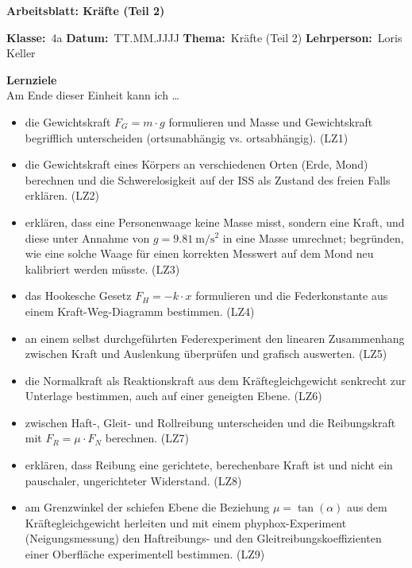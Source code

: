 \documentclass[addpoints,11pt,a4paper]{exam}
\newcommand{\Kopfzeile}[4]{%
  \begin{titlebox}
    {\color{white}\sffamily\bfseries\Large #4}
  \end{titlebox}
  \vspace{0.5em}
  \noindent\textbf{Klasse:}~#1 \hfill \textbf{Datum:}~#2 \hfill \textbf{Thema:}~#3
    \hfill \textbf{Lehrperson:}~Loris Keller
  \vspace{0.8em}
  \lhead{\textcolor{darkgray}{#3}}
  \rhead{\textcolor{darkgray}{#4}}
}
\newcommand{\Klasse}{4a}
\newcommand{\Datum}{TT.MM.JJJJ}
\newcommand{\Thema}{Kräfte (Teil 2)}
\newcommand{\ArbeitsblattTitel}{Arbeitsblatt: Kräfte (Teil 2)}
\begin{document}
\Kopfzeile{\Klasse}{\Datum}{\Thema}{\ArbeitsblattTitel}

\begin{infobox}
\textbf{Lernziele}\\
Am Ende dieser Einheit kann ich \dots
\begin{itemize}[leftmargin=1.2cm,itemsep=0.25em]
  \item die Gewichtskraft $F_G = m\cdot g$ formulieren und Masse und
  Gewichtskraft begrifflich unterscheiden (ortsunabhängig vs.
  ortsabhängig). (LZ1)
  \item die Gewichtskraft eines Körpers an verschiedenen Orten (Erde, Mond)
  berechnen und die Schwerelosigkeit auf der ISS als Zustand des freien
  Falls erklären. (LZ2)
  \item erklären, dass eine Personenwaage keine Masse misst, sondern eine
  Kraft, und diese unter Annahme von $g=\SI{9.81}{\meter\per\second\squared}$
  in eine Masse umrechnet; begründen, wie eine solche Waage für einen
  korrekten Messwert auf dem Mond neu kalibriert werden müsste. (LZ3)
  \item das Hookesche Gesetz $F_H = -k\cdot x$ formulieren und die
  Federkonstante aus einem Kraft-Weg-Diagramm bestimmen. (LZ4)
  \item an einem selbst durchgeführten Federexperiment den linearen
  Zusammenhang zwischen Kraft und Auslenkung überprüfen und grafisch
  auswerten. (LZ5)
  \item die Normalkraft als Reaktionskraft aus dem Kräftegleichgewicht
  senkrecht zur Unterlage bestimmen, auch auf einer geneigten Ebene. (LZ6)
  \item zwischen Haft-, Gleit- und Rollreibung unterscheiden und die
  Reibungskraft mit $F_R = \mu\cdot F_N$ berechnen. (LZ7)
  \item erklären, dass Reibung eine gerichtete, berechenbare Kraft ist und
  nicht ein pauschaler, ungerichteter \glqq Widerstand\grqq{}. (LZ8)
  \item am Grenzwinkel der schiefen Ebene die Beziehung
  $\mu = \tan(\alpha)$ aus dem Kräftegleichgewicht herleiten und mit einem
  phyphox-Experiment (Neigungsmessung) den Haftreibungs- und den
  Gleitreibungskoeffizienten einer Oberfläche experimentell bestimmen.
  (LZ9)
\end{itemize}
\end{infobox}
\end{document}
